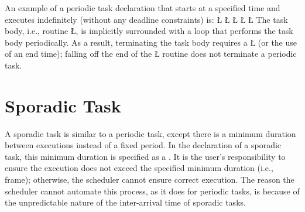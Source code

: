 \documentclass[openright,twoside]{report}
\begin{document}
An example of a periodic task declaration that starts at a specified time and executes indefinitely (without any deadline constraints) is:
\LGinlinefalse\LGbegin\lgrinde
\L{}
\L{\LB{}}
\L{}
\L{\LB{}}
\L{\LB{\};}}
\endlgrinde\LGend
The task body, i.e., routine \LGinlinetrue\LGbegin\lgrinde\L{}\endlgrinde\LGend{}, is implicitly surrounded with a loop that performs the task body periodically.
As a result, terminating the task body requires a \LGinlinetrue\LGbegin\lgrinde\L{}\endlgrinde\LGend{} (or the use of an end time);
falling off the end of the \LGinlinetrue\LGbegin\lgrinde\L{}\endlgrinde\LGend{} routine does not terminate a periodic task.


\section{Sporadic Task}

A sporadic task is similar to a periodic task, except there is a minimum duration between executions instead of a fixed period.
In the declaration of a sporadic task, this minimum duration is specified as a .
It is the user's responsibility to ensure the execution does not exceed the specified minimum duration (i.e., frame);
otherwise, the scheduler cannot ensure correct execution.
The reason the scheduler cannot automate this process, as it does for periodic tasks, is because of the unpredictable nature of the inter-arrival time of sporadic tasks.
\end{document}
